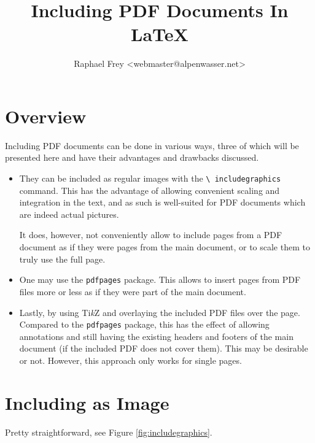 \documentclass[a4paper,oneside]{article}
\title{Including PDF Documents In \LaTeX}
\author{Raphael Frey <webmaster@alpenwasser.net>}
\newcommand\code[1]{\texttt{#1}}
\begin{document}
\maketitle

\tableofcontents

\section{Overview}

Including PDF documents  can be done in  various ways, three of  which will be
presented here and have their advantages and drawbacks discussed.

\begin{itemize}
    \item
        They can be  included as regular images  with the \code{\textbackslash
        includegraphics}   command. This  has   the   advantage  of   allowing
        convenient  scaling  and integration  in  the  text,  and as  such  is
        well-suited for PDF documents which are indeed actual pictures.

        It does, however,  not conveniently allow to include pages  from a PDF
        document as  if they were  pages from the  main document, or  to scale
        them to truly use the full page.
    \item
        One may use  the \code{pdfpages} package. This allows  to insert pages
        from PDF files more or less as if they were part of the main document.
    \item
        Lastly, by  using Ti\emph{k}Z  and overlaying  the included  PDF files
        over the page. Compared  to the \code{pdfpages} package,  this has the
        effect of allowing  annotations and still having  the existing headers
        and footers of  the main document (if the included  PDF does not cover
        them). This may be desirable or not. However, this approach only works
        for single pages.
\end{itemize}

\clearpage
\section{Including as Image}
\label{sec:includegraphics}

Pretty straightforward, see Figure \ref{fig:includegraphics}.
\end{document}
